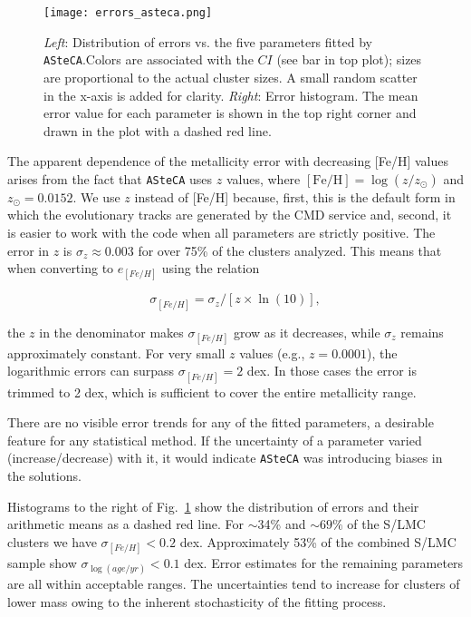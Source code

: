 \documentclass{aa}
\begin{document}
\begin{figure}[!ht]
\centering
\texttt{[image: errors\_asteca.png]}
\caption{\emph{Left}: Distribution of errors vs. the five parameters fitted
by \texttt{ASteCA}.\@ Colors are associated with the $CI$ (see bar in top plot);
sizes are proportional to the actual cluster sizes. A small random scatter in
the x-axis is added for clarity.
\emph{Right}: Error histogram. The mean error value for each parameter is shown
in the top right corner and drawn in the plot with a dashed red line.}
\label{fig:errors}
\end{figure}

The apparent dependence of the metallicity error with decreasing [Fe/H] values
arises from the fact that \texttt{ASteCA} uses $z$ values, where
$\mathrm{[Fe/H]}{=}\log(z/z_{\odot})$ and  $z_{\odot}{=}0.0152$. We use $z$
instead of [Fe/H] because, first, this is the default form in which the evolutionary
tracks are generated by the CMD service and, second, it is easier to work with the
code when all parameters are strictly positive.
The error in $z$ is $\sigma_z{\approx}0.003$ for over 75\% of the clusters
analyzed. This means that when converting to $e_{[Fe/H]}$ using the relation

\begin{equation}
\sigma_{[Fe/H]} = \sigma_z/[z\times\ln(10)],
\end{equation}

\noindent the $z$ in the denominator makes $\sigma_{[Fe/H]}$ grow as it
decreases, while $\sigma_z$ remains approximately constant.
For very small $z$ values (e.g., $z{=}0.0001$), the logarithmic errors can
surpass $\sigma_{[Fe/H]}{=}2$ dex. In those cases the error is trimmed to 2 dex,
which is sufficient to cover the entire metallicity range.

There are no visible error trends for any of the fitted parameters, a desirable
feature for any statistical method. If the uncertainty of a parameter varied 
(increase/decrease) with it, it would indicate \texttt{ASteCA} was
introducing biases in the solutions.

Histograms to the right of Fig.~\ref{fig:errors} show the distribution
of errors and their arithmetic means as a dashed red line.
For $\sim$34\% and ${\sim}69\%$ of the S/LMC clusters we have
$\sigma_{[Fe/H]}{<}0.2$ dex.
Approximately 53\% of the combined S/LMC sample show
$\sigma_{\log(age/yr)}{<}0.1$ dex. Error estimates for the remaining parameters
are all within acceptable ranges. The uncertainties tend to increase for
clusters of lower mass owing to the inherent stochasticity of the fitting
process.\\
\end{document}
